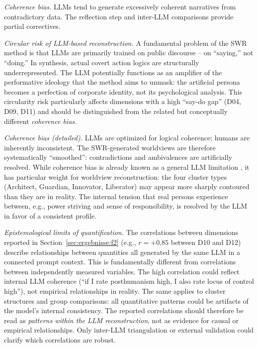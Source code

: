 \documentclass[12pt,a4paper]{article}
\begin{document}
\emph{Coherence bias.} LLMs tend to generate excessively coherent narratives from contradictory data. The reflection step and inter-LLM comparisons provide partial correctives.

\emph{Circular risk of LLM-based reconstruction.} A fundamental problem of the SWR method is that LLMs are primarily trained on public discourse -- on ``saying,'' not ``doing.'' In synthesis, actual covert action logics are structurally underrepresented. The LLM potentially functions as an amplifier of the performative ideology that the method aims to unmask: the artificial persona becomes a perfection of corporate identity, not its psychological analysis. This circularity risk particularly affects dimensions with a high ``say-do gap'' (D04, D09, D11) and should be distinguished from the related but conceptually different \emph{coherence bias}.

\emph{Coherence bias (detailed).} LLMs are optimized for logical coherence; humans are inherently inconsistent. The SWR-generated worldviews are therefore systematically ``smoothed'': contradictions and ambivalences are artificially resolved. While coherence bias is already known as a general LLM limitation \citep{Geiger2026SWR}, it has particular weight for worldview reconstruction: the four cluster types (Architect, Guardian, Innovator, Liberator) may appear more sharply contoured than they are in reality. The internal tension that real persons experience between, e.g., power striving and sense of responsibility, is resolved by the LLM in favor of a consistent profile.

\emph{Epistemological limits of quantification.} The correlations between dimensions reported in Section~\ref{sec:ergebnisse:f2} (e.g., $r = +0.85$ between D10 and D12) describe relationships between quantities all generated by the same LLM in a connected prompt context. This is fundamentally different from correlations between independently measured variables. The high correlation could reflect internal LLM coherence (``if I rate posthumanism high, I also rate locus of control high''), not empirical relationships in reality. The same applies to cluster structures and group comparisons: all quantitative patterns could be artifacts of the model's internal consistency. The reported correlations should therefore be read as \emph{patterns within the LLM reconstruction}, not as evidence for causal or empirical relationships. Only inter-LLM triangulation or external validation could clarify which correlations are robust.
\end{document}
